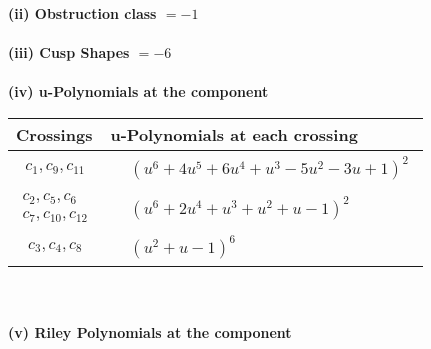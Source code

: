 \documentclass[1p]{elsarticle_modified}
\theoremstyle{definition}
\begin{document}
\flushleft \textbf{(ii) Obstruction class $= -1$}\\~\\
\flushleft \textbf{(iii) Cusp Shapes $= -6$}\\~\\
\newpage\renewcommand{\arraystretch}{1}
\flushleft \textbf{(iv) u-Polynomials at the component}\newline \\
\begin{tabular}{m{50pt}|m{274pt}}
Crossings & \hspace{64pt}u-Polynomials at each crossing \\
\hline $$\begin{aligned}c_{1},c_{9},c_{11}\end{aligned}$$&$\begin{aligned}
&(u^6+4 u^5+6 u^4+u^3-5 u^2-3 u+1)^2
\end{aligned}$\\
\hline $$\begin{aligned}c_{2},c_{5},c_{6}\\c_{7},c_{10},c_{12}\end{aligned}$$&$\begin{aligned}
&(u^6+2 u^4+u^3+u^2+u-1)^2
\end{aligned}$\\
\hline $$\begin{aligned}c_{3},c_{4},c_{8}\end{aligned}$$&$\begin{aligned}
&(u^2+u-1)^6
\end{aligned}$\\
\hline
\end{tabular}\\~\\
\newpage\renewcommand{\arraystretch}{1}
\flushleft \textbf{(v) Riley Polynomials at the component}\newline \\
\end{document}
